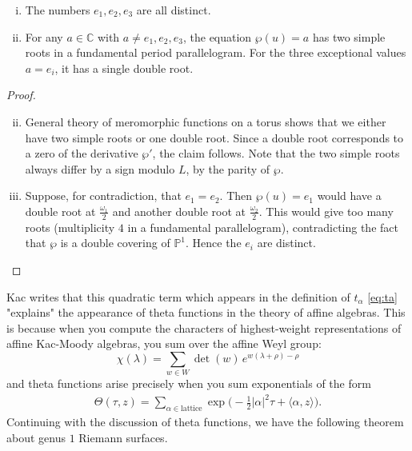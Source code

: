 \documentclass[12pt]{article}
\begin{document}
\begin{proposition}\label{prop:wp-map}
    \leavevmode
    \begin{enumerate}[(i)]
        \item The numbers $e_1,e_2,e_3$ are all distinct.
        \item For any $a \in \mathbb{C}$ with $a \neq e_1,e_2,e_3$, the equation $\wp(u)=a$ has two simple roots in a fundamental period parallelogram. For the three exceptional values $a=e_i$, it has a single double root.
    \end{enumerate}
\end{proposition}

\begin{proof}
    \leavevmode
    \begin{enumerate}[(i)]
        \setcounter{enumi}{1}
        \item General theory of meromorphic functions on a torus shows that we either have two simple roots or one double root. Since a double root corresponds to a zero of the derivative $\wp'$, the claim follows. Note that the two simple roots always differ by a sign modulo $L$, by the parity of $\wp$.

              \setcounter{enumi}{0}
        \item Suppose, for contradiction, that $e_1=e_2$. Then $\wp(u)=e_1$ would have a double root at $\tfrac{\omega_1}{2}$ and another double root at $\tfrac{\omega_2}{2}$. This would give too many roots (multiplicity $4$ in a fundamental parallelogram), contradicting the fact that $\wp$ is a double covering of $\mathbb{P}^1$. Hence the $e_i$ are distinct.
    \end{enumerate}
\end{proof}
\begin{remark}
    Kac writes that this quadratic term which appears in the definition of $t_\alpha$ \ref{eq:ta} "explains" the appearance of theta functions in the theory of affine algebras. This is because when you compute the characters of highest-weight representations of affine Kac-Moody algebras, you sum over the affine Weyl group:
    \[\chi(\lambda) = \sum_{w \in W} \det(w)\, e^{w(\lambda+\rho) - \rho}\]
    and theta functions arise precisely when you sum exponentials of the form \begin{align*}
        \Theta(\tau, z) = \sum_{\alpha \in \text{lattice}} \exp\!\big(-\tfrac{1}{2}|\alpha|^2 \tau + \langle \alpha, z\rangle\big).
    \end{align*}
    Continuing with the discussion of theta functions, we have the following theorem about genus $1$ Riemann surfaces.
\end{remark}
\end{document}
